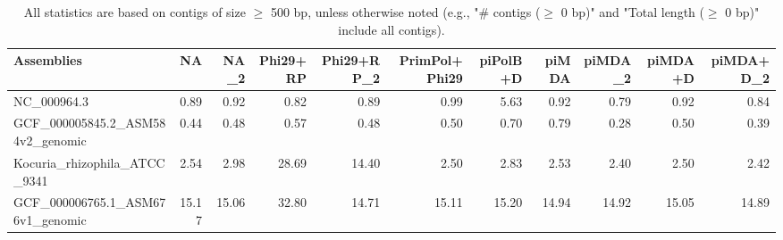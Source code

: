 \documentclass[12pt,a4paper]{article}
\begin{document}
\begin{table}[ht]
\begin{center}
\caption{All statistics are based on contigs of size $\geq$ 500 bp, unless otherwise noted (e.g., "\# contigs ($\geq$ 0 bp)" and "Total length ($\geq$ 0 bp)" include all contigs).}
\begin{tabular}{|l*{10}{|r}|}
\hline
Assemblies & NA & NA\_2 & Phi29+RP & Phi29+RP\_2 & PrimPol+Phi29 & piPolB+D & piMDA & piMDA\_2 & piMDA+D & piMDA+D\_2 \\ \hline
NC\_000964.3 & 0.89 & 0.92 & 0.82 & 0.89 & 0.99 & 5.63 & 0.92 & 0.79 & 0.92 & 0.84 \\ \hline
GCF\_000005845.2\_ASM584v2\_genomic & 0.44 & 0.48 & 0.57 & 0.48 & 0.50 & 0.70 & 0.79 & 0.28 & 0.50 & 0.39 \\ \hline
Kocuria\_rhizophila\_ATCC\_9341 & 2.54 & 2.98 & 28.69 & 14.40 & 2.50 & 2.83 & 2.53 & 2.40 & 2.50 & 2.42 \\ \hline
GCF\_000006765.1\_ASM676v1\_genomic & 15.17 & 15.06 & 32.80 & 14.71 & 15.11 & 15.20 & 14.94 & 14.92 & 15.05 & 14.89 \\ \hline
\end{tabular}
\end{center}
\end{table}
\end{document}
